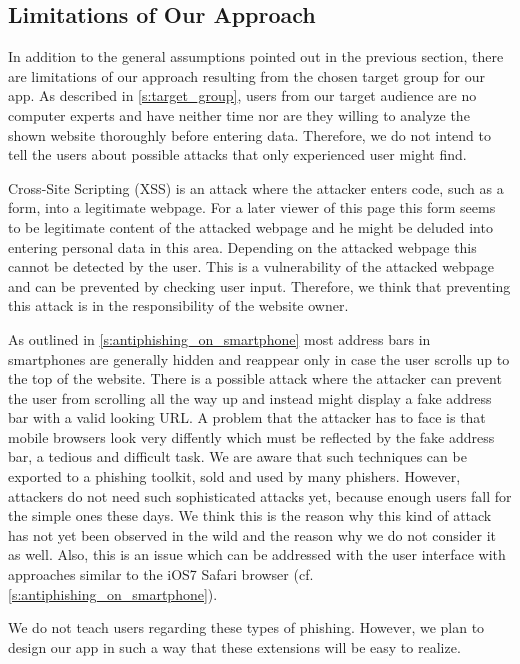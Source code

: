\subsection{Limitations of Our Approach}
In addition to the general assumptions pointed out in the previous section, there are limitations of our approach resulting from the chosen target group for our app.
As described in \autoref{s:target_group}, users from our target audience are no computer experts and have neither time nor are they willing to analyze the shown website thoroughly before entering data.
Therefore, we do not intend to tell the users about possible attacks that only experienced user might find.
\begin{description}[leftmargin=0cm]
	\item[Cross-Site Scripting:]
	Cross-Site Scripting (XSS) is an attack where the attacker enters code, such as a form, into a legitimate webpage.
	For a later viewer of this page this form seems to be legitimate content of the attacked webpage and he might be deluded into entering personal data in this area. 
	Depending on the attacked webpage this cannot be detected by the user.
	This is a vulnerability of the attacked webpage and can be prevented by checking user input.
	Therefore, we think that preventing this attack is in the responsibility of the website owner.
	\item[URL Hiding Techniques:]
	As outlined in \autoref{s:antiphishing_on_smartphone} most address bars in smartphones are generally hidden and reappear only in case the user scrolls up to the top of the website.
	There is a possible attack where the attacker can prevent the user from scrolling all the way up and instead might display a fake address bar with a valid looking URL.
	A problem that the attacker has to face is that mobile browsers look very diffently which must be reflected by the fake address bar, a tedious and difficult task.
	We are aware that such techniques can be exported to a phishing toolkit, sold and used by many phishers. However, attackers do not need such sophisticated attacks yet, because enough users fall for the simple ones these days. 
	We think this is the reason why this kind of attack has not yet been observed in the wild and the reason why we do not consider it as well.
Also, this is an issue which can be addressed with the user interface with approaches similar to the iOS7 Safari browser (cf. \autoref{s:antiphishing_on_smartphone}).
\end{description}
We do not teach users regarding these types of phishing. However, we plan to design our app in such a way that these extensions will be easy to realize.